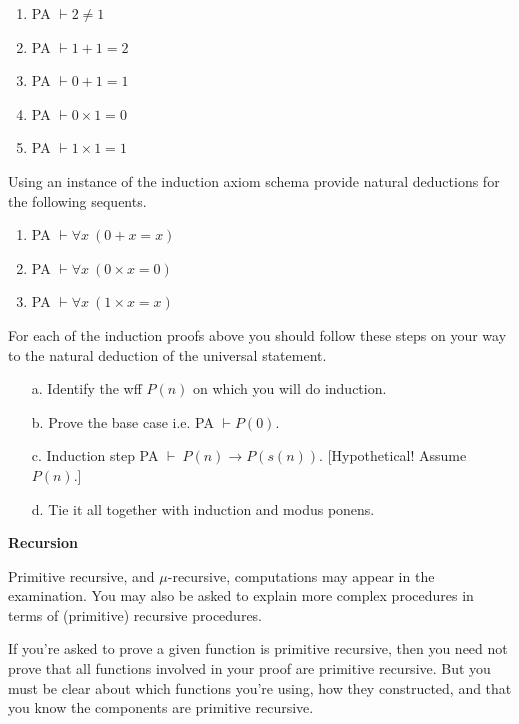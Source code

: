 \documentclass[11pt]{report}
\begin{document}
\begin{enumerate}
	\item PA $\vdash 2 \neq 1$
	\item PA $\vdash 1 + 1 = 2$
	\item PA $\vdash 0 + 1 = 1$
	\item PA $\vdash 0 \times 1 = 0$
	\item PA $\vdash 1 \times 1 = 1$
\end{enumerate}

Using an instance of the induction axiom schema provide natural deductions for the following sequents.

\begin{enumerate}
	\item PA $\vdash \forall x \ (0 + x = x)$
	\item PA $\vdash \forall x \ (0 \times x = 0)$
	\item PA $\vdash \forall x \ (1 \times x = x)$
\end{enumerate}

For each of the induction proofs above you should follow these steps on your way to the natural deduction of the universal statement. 

\begin{enumerate}
	\item[a.] Identify the wff $P(n)$ on which you will do induction. 
	\item[b.] Prove the base case i.e. PA $\vdash P(0)$.
	\item[c.] Induction step PA $\vdash \ P(n) \rightarrow P(s(n))$. [Hypothetical! Assume $P(n)$.]
	\item[d.] Tie it all together with induction and modus ponens. 
\end{enumerate}


\newpage
{\bf Recursion}

Primitive recursive, and $\mu$-recursive, computations may appear in the examination. You may also be asked to explain more complex procedures in terms of (primitive) recursive procedures. 

\vspace{0.5cm}

If you're asked to prove a given function is primitive recursive, then you need not prove that all functions involved in your proof are primitive recursive. But you must be clear about which functions you're using, how they constructed, and that you know the components are primitive recursive. 
\end{document}
